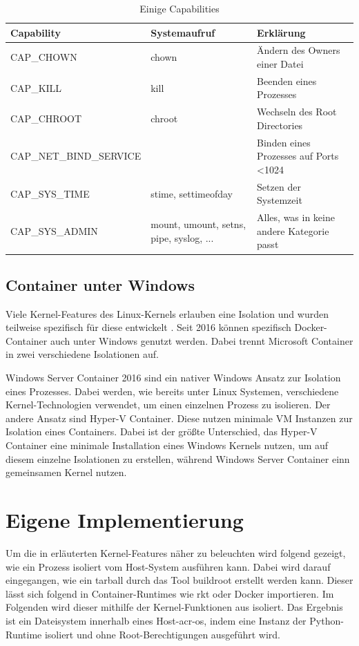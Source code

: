 \begin{table}[h]
	\begin{center}
		\begin{tabu}to 0.9
			\toprule
			Capability 		& Systemaufruf 			& Erklärung						\\
			\midrule
			CAP\_CHOWN 		& chown 				& Ändern des Owners einer Datei \\
			CAP\_KILL 		& kill 					& Beenden eines Prozesses		\\
			CAP\_CHROOT		& chroot				& Wechseln des Root Directories	\\
			\midrule
			CAP\_NET\_BIND\_SERVICE & & Binden eines Prozesses auf Ports \textless 1024 \\
			\midrule
			CAP\_SYS\_TIME	& stime, settimeofday	& Setzen der Systemzeit 		\\
			CAP\_SYS\_ADMIN	& mount, umount, setns, pipe, syslog, ... 	& Alles, was in keine andere Kategorie passt 														\\
			\bottomrule
		\end{tabu}
	\end{center}
	\caption{Einige Capabilities \citep{Capabilities7LinuxManualPage}}
	\label{tab:capabilities}
\end{table}

\subsection{Container unter Windows}
\label{sec:windows}
Viele Kernel-Features des Linux-Kernels erlauben eine Isolation und wurden teilweise spezifisch für diese entwickelt \citep{Namespaces7LinuxManualPage}. Seit 2016 können spezifisch Docker-Container auch unter Windows genutzt werden. Dabei trennt Microsoft Container in zwei verschiedene Isolationen auf.

Windows Server Container 2016 sind ein nativer Windows Ansatz zur Isolation eines Prozesses. Dabei werden, wie bereits unter Linux Systemen, verschiedene Kernel-Technologien verwendet, um einen einzelnen Prozess zu isolieren. Der andere Ansatz sind Hyper-V Container. Diese nutzen minimale VM Instanzen zur Isolation eines Containers. Dabei ist der größte Unterschied, das Hyper-V Container eine minimale Installation eines Windows Kernels nutzen, um auf diesem einzelne Isolationen zu erstellen, während Windows Server Container einn gemeinsamen Kernel nutzen.

\section{Eigene Implementierung}
\label{sec:eigeneImpl}
Um die in  erläuterten Kernel-Features näher zu beleuchten wird folgend gezeigt, wie ein Prozess isoliert vom Host-System ausführen kann. Dabei wird darauf eingegangen, wie ein tarball durch das Tool buildroot erstellt werden kann. Dieser lässt sich folgend in Container-Runtimes wie rkt oder Docker importieren. Im Folgenden wird dieser mithilfe der Kernel-Funktionen aus  isoliert. Das Ergebnis ist ein Dateisystem innerhalb eines Host-\gls{acr-os}, indem  eine Instanz der Python-Runtime isoliert und ohne Root-Berechtigungen ausgeführt wird.

